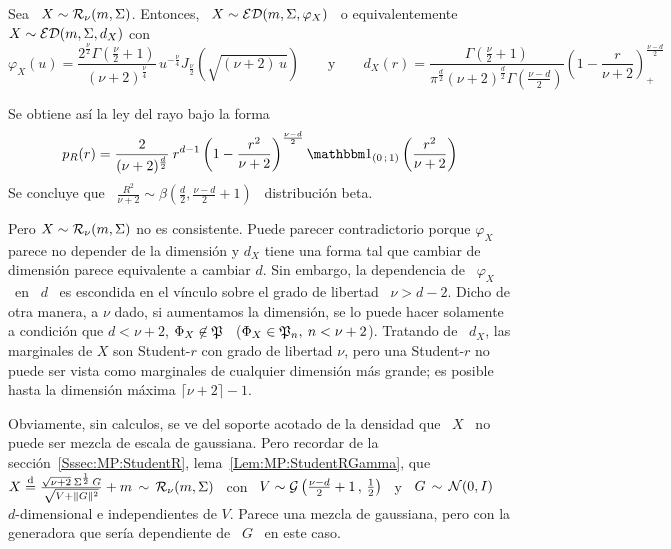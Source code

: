\begin{ejemplo}
%
  Sea \ $X \sim \mathcal{R}_\nu(m,\Sigma)$.  Entonces, \ $X \sim \mathcal{ED}(m,\Sigma,\varphi_X)$
  \ o equivalentemente \ $X \sim \mathcal{ED}(m,\Sigma,d_X)$ con
  \[
  \varphi_X(u)   =   \frac{2^{\frac{\nu}{2}}   \Gamma\left(   \frac{\nu}{2}   +1
    \right)}{(\nu+2)^{\frac{\nu}{4}}}            \,           u^{-\frac{\nu}{4}}
  J_{\frac{\nu}{2}}\left(  \sqrt{(\nu+2) \,  u} \right)  \qquad  \mbox{y} \qquad
  d_X(r)  =  \frac{\Gamma\left(  \frac{\nu}{2}  +  1  \right)}{\pi^{\frac{d}{2}}
    (\nu+2)^{\frac{d}{2}}  \Gamma\left(  \frac{\nu-d}{2}  \right)}  \left(  1  -
    \frac{r}{\nu+2} \right)_+^{\frac{\nu-d}{2}}
  \]
  
  Se obtiene as\'i la ley del rayo bajo la forma
  \[
  p_R(r) = \frac{2}{(\nu+2)^{\frac{d}{2}}} \:  r^{d-1} \left( 1 - \frac{r^2}{\nu+2}
  \right)^{\frac{\nu-d}{2}} \un_{(0 \; 1)}\left( \frac{r^2}{\nu+2} \right)
  \]
  Se  concluye   que  \   $\frac{R^2}{\nu+2}  \sim  \beta\left(   \frac{d}{2}  ,
    \frac{\nu-d}{2}+1 \right)$ \ distribuci\'on beta.

  Pero $X \sim \mathcal{R}_\nu(m,\Sigma)$ no es consistente. Puede parecer contradictorio
  porque  $\varphi_X$ parece no  depender de  la dimensi\'on  y $d_X$  tiene una
  forma tal  que cambiar  de dimensi\'on parece  equivalente a cambiar  $d$. Sin
  embargo, la  dependencia de  \ $\varphi_X$  \ en \  $d$ \  es escondida  en el
  v\'inculo sobre el  grado de libertad \  $\nu > d-2$. Dicho de  otra manera, a
  $\nu$  dado, si  aumentamos  la dimensi\'on,  se  lo puede  hacer solamente  a
  condici\'on que $d < \nu+2$, \ie $\Phi_X \not\in \mathfrak{P}$ \ ($\Phi_X \in \mathfrak{P}_n, \:
  n < \nu+2$).   Tratando de \ $d_X$, las marginales de  $X$ son Student-$r$ con
  grado  de  libertad  $\nu$, pero  una  Student-$r$  no  puede ser  vista  como
  marginales  de  cualquier  dimensi\'on  m\'as  grande;  es  posible  hasta  la
  dimensi\'on m\'axima $\lceil \nu+2 \rceil-1$.

  Obviamente, sin calculos, se ve del soporte acotado de la densidad que \ $X$ \
  no  puede   ser  mezcla  de  escala   de  gaussiana.   Pero   recordar  de  la
  secci\'on~\ref{Sssec:MP:StudentR},  lema~\ref{Lem:MP:StudentRGamma}, que  \ $X
  \stackrel{\mathrm{d}}{=} \frac{\sqrt{\nu+2} \: \Sigma^{\frac12} \, G}{\sqrt{V + \|G\|^2}} + m \,
  \sim \, \mathcal{R}_\nu( m , \Sigma )$  \ con \ $V \sim \mathcal{G}\left( \frac{\nu-d}{2}+1 \, ,
    \,  \frac12 \right)$  \  y \  $G \,  \sim  \, \mathcal{N}(0,I)$  \ $d$-dimensional  e
  independientes de $V$.  Parece una mezcla de gaussiana, pero con la generadora
  que ser\'ia dependiente de \ $G$ \ en este caso.
\end{ejemplo}

